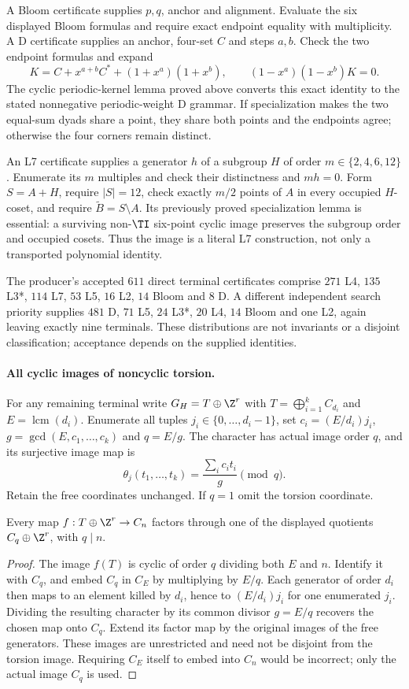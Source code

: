 A Bloom certificate supplies $p,q$, anchor and alignment. Evaluate the
six displayed Bloom formulas and require exact endpoint equality with
multiplicity. A D certificate supplies an anchor, four-set $C$ and steps
$a,b$. Check the two endpoint formulas and expand
\[
 K=C+x^{a+b}C^*+(1+x^a)(1+x^b),\qquad
 (1-x^a)(1-x^b)K=0.
\]
The cyclic periodic-kernel lemma proved above converts this exact identity
to the stated nonnegative periodic-weight D grammar. If specialization
makes the two equal-sum dyads share a point, they share both points and
the endpoints agree; otherwise the four corners remain distinct.

An L7 certificate supplies a generator $h$ of a subgroup $H$ of order
$m\in\{2,4,6,12\}$. Enumerate its $m$ multiples and check their
distinctness and $mh=0$. Form $S=A+H$, require $|S|=12$, check exactly
$m/2$ points of $A$ in every occupied $H$-coset, and require
$\widetilde B=S\setminus A$. Its previously proved specialization
lemma is essential: a surviving non-$\TI$ six-point cyclic image
preserves the subgroup order and occupied cosets. Thus the image is a
literal L7 construction, not only a transported polynomial identity.

The producer's accepted $611$ direct terminal certificates comprise
$271$ L4, $135$ L3*, $114$ L7, $53$ L5, $16$ L2, $14$ Bloom and $8$ D.
A different independent search priority supplies $481$ D, $71$ L5,
$24$ L3*, $20$ L4, $14$ Bloom and one L2, again leaving exactly nine
terminals. These distributions are not invariants or a disjoint
classification; acceptance depends on the supplied identities.

\paragraph{All cyclic images of noncyclic torsion.}
For any remaining terminal write $G_H=T\oplus\Z^r$ with
$T=\bigoplus_{i=1}^k C_{d_i}$ and $E=\operatorname{lcm}(d_i)$.
Enumerate all tuples $j_i\in\{0,\ldots,d_i-1\}$, set
$c_i=(E/d_i)j_i$, $g=\gcd(E,c_1,\ldots,c_k)$ and $q=E/g$.
The character has actual image order $q$, and its surjective image map is
\[
 \theta_j(t_1,\ldots,t_k)=
 \frac{\sum_i c_it_i}{g}\pmod q.
\]
Retain the free coordinates unchanged. If $q=1$ omit the torsion coordinate.

\begin{lemma}
Every map $f:T\oplus\Z^r\to C_n$ factors through one of the displayed
quotients $C_q\oplus\Z^r$, with $q\mid n$.
\end{lemma}
\begin{proof}
The image $f(T)$ is cyclic of order $q$ dividing both $E$ and $n$.
Identify it with $C_q$, and embed $C_q$ in $C_E$ by multiplying by
$E/q$. Each generator of order $d_i$ then maps to an element killed by
$d_i$, hence to $(E/d_i)j_i$ for one enumerated $j_i$. Dividing the
resulting character by its common divisor $g=E/q$ recovers the chosen
map onto $C_q$. Extend its factor map by the original images of the free
generators. These images are unrestricted and need not be disjoint from
the torsion image. Requiring $C_E$ itself to embed into $C_n$ would be
incorrect; only the actual image $C_q$ is used.
\end{proof}

